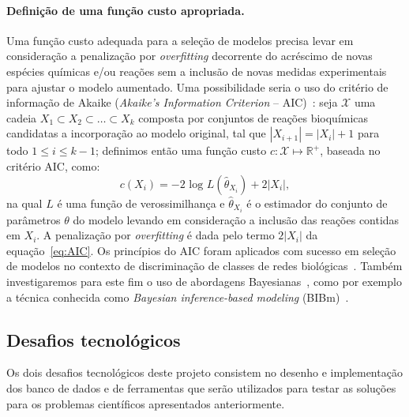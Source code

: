\documentclass[12pt]{article}
\begin{document}


\paragraph{Definição de uma função custo apropriada.} Uma função custo adequada para a seleção de modelos precisa levar em consideração a penalização por {\em overfitting} decorrente do acréscimo de novas espécies químicas e/ou reações sem a inclusão de novas medidas experimentais para ajustar o modelo aumentado. Uma possibilidade seria o uso do critério de informação de Akaike ({\em Akaike's Information Criterion} -- AIC)~\cite{bozdogan1987model}: seja $\mathcal{X}$ uma cadeia $X_1 \subset X_2 \subset \ldots \subset X_k$ composta por conjuntos de reações bioquímicas candidatas a incorporação ao modelo original, tal que $|X_{i+1}| = |X_i| + 1$ para todo $1 \le i \le k - 1$; definimos então uma função custo $c : \mathcal{X} \mapsto \mathbb{R}^+$, baseada no critério AIC, como:
\begin{equation}
c(X_i) = - 2 \mbox{ log } L(\hat{\theta}_{X_i}) + 2 |X_i|, \label{eq:AIC}
\end{equation}
na qual $L$ é uma função de verossimilhança e $\hat{\theta}_{X_i}$ é o estimador do conjunto de parâmetros $\theta$ do modelo levando em consideração a inclusão das reações contidas em $X_i$. A penalização por {\em overfitting} é dada pelo termo $2 |X_i|$ da equação~\ref{eq:AIC}. Os princípios do AIC foram aplicados com sucesso em seleção de modelos no contexto de discriminação de classes de redes biológicas~\cite{takahashi2012discriminating}. Também investigaremos para este fim o uso de abordagens Bayesianas~\cite{kirk2013model}, como por exemplo a técnica conhecida como {\em Bayesian inference-based modeling} (BIBm)~\cite{Xu2010}.



\subsection{Desafios tecnológicos}

Os dois desafios tecnológicos deste projeto consistem no desenho e implementação dos banco de dados e de ferramentas que serão utilizados para testar as soluções para os problemas científicos apresentados anteriormente.
\end{document}

